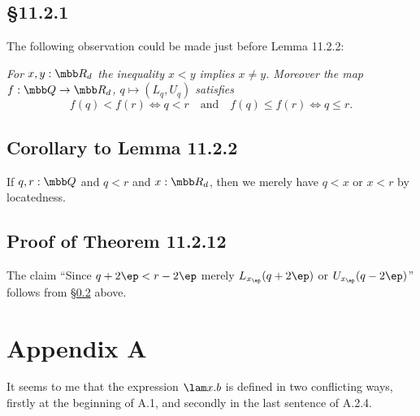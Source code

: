\documentclass[12pt]{article}
\begin{document}

\subsection{\S11.2.1}

The following observation could be made just before Lemma 11.2.2: 

\nn\emph{For $x,y:\mbb R_d$ the inequality $x<y$ implies $x\neq y$. Moreover the map $f:\mbb Q\to\mbb R_d$, $q\mapsto(L_q,U_q)$ satisfies}
$$
f(q)<f(r)\iff q<r\quad\text{and}\quad f(q)\le f(r)\iff q\le r.
$$ 


\subsection{Corollary to Lemma 11.2.2}\label{1122}

If $q,r:\mbb Q$ and $q<r$ and $x:\mbb R_d$, then we merely have $q<x$ or $x<r$ by locatedness.

\subsection{Proof of Theorem 11.2.12}

The claim ``Since $q+2\ep<r-2\ep$ merely $L_{x_\ep}(q+2\ep)$ or $U_{x_\ep}(q-2\ep)$'' follows from \S\ref{1122} above.


\section{Appendix A}

It seems to me that the expression $\lam x.b$ is defined in two conflicting ways, firstly at the beginning of A.1, and secondly in the last sentence of A.2.4. 
\end{document}
